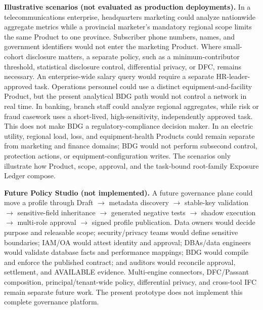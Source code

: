 \documentclass[journal,onecolumn]{IEEEtran}
\begin{document}
\textbf{Illustrative scenarios (not evaluated as production deployments).}
In a telecommunications enterprise, headquarters marketing could analyze
nationwide aggregate metrics while a provincial marketer's mandatory regional
scope limits the same Product to one province. Subscriber phone numbers, names,
and government identifiers would not enter the marketing Product. Where
small-cohort disclosure matters, a separate policy, such as a
minimum-contributor threshold, statistical disclosure control, differential
privacy, or DFC, remains necessary. An enterprise-wide salary query would
require a separate HR-leader-approved task. Operations personnel could use a
distinct equipment-and-facility Product, but the present analytical BDG path would not
control a network in real time. In banking, branch staff
could analyze regional aggregates, while risk or fraud casework uses a
short-lived, high-sensitivity, independently approved task. This does not make
BDG a regulatory-compliance decision maker. In an electric utility, regional
load, loss, and equipment-health Products could remain
separate from marketing and finance domains; BDG would not perform subsecond
control, protection actions, or equipment-configuration writes. The scenarios
only illustrate how Product, scope, approval, and the task-bound root-family
Exposure Ledger compose.

\textbf{Future Policy Studio (not implemented).}
A future governance plane could move a profile through
Draft $\rightarrow$ metadata discovery $\rightarrow$ stable-key validation
$\rightarrow$ sensitive-field inheritance $\rightarrow$ generated negative
tests $\rightarrow$ shadow execution $\rightarrow$ multi-role approval
$\rightarrow$ signed profile publication. Data owners would decide purpose and
releasable scope; security/privacy teams would define sensitive boundaries;
IAM/OA would attest identity and approval; DBAs/data engineers would validate
database facts and performance mappings; BDG would compile and enforce the
published contract; and auditors would reconcile approval, settlement, and
AVAILABLE evidence. Multi-engine connectors, DFC/Passant composition,
principal/tenant-wide policy, differential privacy, and cross-tool IFC remain
separate future work. The present prototype does not implement this complete
governance platform.
\end{document}
